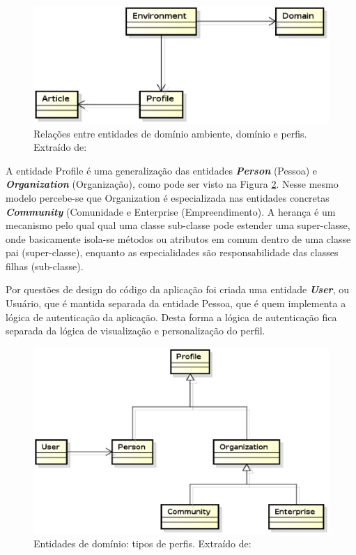 \begin{figure}[h]
    \centering
    \includegraphics[keepaspectratio=true,scale=0.65]
      {figuras/domain_main.eps}
    \caption{Relações entre entidades de domínio ambiente, domínio e perfis. Extraído de: \cite{bucher2013rede}}
    \label{domain_main}
\end{figure}

A entidade Profile é uma generalização das entidades \textbf{\textit{Person}} (Pessoa) e \textbf{\textit{Organization}} (Organização), como pode ser visto na Figura \ref{domain_profiles}. Nesse mesmo modelo percebe-se que Organization é especializada nas entidades concretas \textbf{\textit{Community}} (Comunidade e Enterprise (Empreendimento). A herança é um mecanismo pelo qual qual uma classe sub-classe pode estender uma super-classe, onde basicamente isola-se métodos ou atributos em comum dentro de uma classe pai (super-classe), enquanto as especialidades são responsabilidade das classes filhas (sub-classe).

Por questões de design do código da aplicação foi criada uma entidade \textbf{\textit{User}}, ou Usuário, que é mantida separada da entidade Pessoa, que é quem implementa a lógica de autenticação da aplicação. Desta forma a lógica de autenticação fica separada da lógica de visualização e personalização do perfil.

\begin{figure}[h]
    \centering
    \includegraphics[keepaspectratio=true,scale=0.6]
      {figuras/domain_profiles.eps}
    \caption{Entidades de domínio: tipos de perfis. Extraído de: \cite{bucher2013rede}}
    \label{domain_profiles}
\end{figure}

